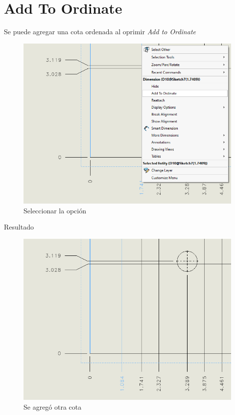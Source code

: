 \documentclass[12pt,letterpaper,final]{report}
\begin{document}
\section{Add To Ordinate}

Se puede agregar una cota ordenada al oprimir \emph{Add to Ordinate}

\begin{figure}[H]
	\centering
	\includegraphics[width=0.85\linewidth, height=0.5\textheight,keepaspectratio]{Imagenes/solidworks_addtoordinate01}
	\caption{Seleccionar la opción}
	\label{fig:solidworksaddtoordinate01}
\end{figure}

\pagebreak

{\LARGE Resultado}

\begin{figure}[H]
	\centering
	\includegraphics[width=0.85\linewidth, height=0.5\textheight,keepaspectratio]{Imagenes/solidworks_addtoordinate02}
	\caption{Se agregó otra cota}
	\label{fig:solidworksaddtoordinate02}
\end{figure}
\end{document}
